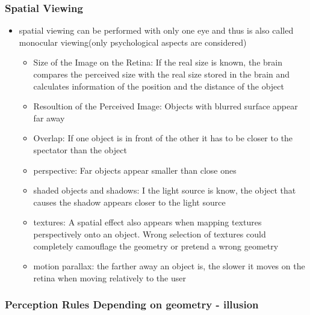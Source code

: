 \documentclass{standalone}
\begin{document}
\subsubsection*{Spatial Viewing}
\begin{itemize}
\item spatial viewing can be performed with only one eye and thus is also called monocular viewing(only psychological aspects are considered)
	\begin{itemize}
		\item Size of the Image on the Retina: If the real size is known, the brain compares the perceived size with the real size stored in the brain and calculates information of the position and the distance of the object
		\item Resoultion of the Perceived Image: Objects with blurred surface appear far away
		\item Overlap: If one object is in front of the other it has to be closer to the spectator than the object
		\item perspective: Far objects appear smaller than close ones
		\item shaded objects and shadows: I the light source is know, the object that causes the shadow appears closer to the light source
		\item textures: A spatial effect also appears when mapping textures perspectively onto an object. Wrong selection of textures could completely camouflage the geometry or pretend a wrong geometry
		\item motion parallax: the farther away an object is, the slower it moves on the retina when moving relatively to the user
	\end{itemize}
\end{itemize}

\subsubsection*{Perception Rules Depending on geometry - illusion}
\end{document}
